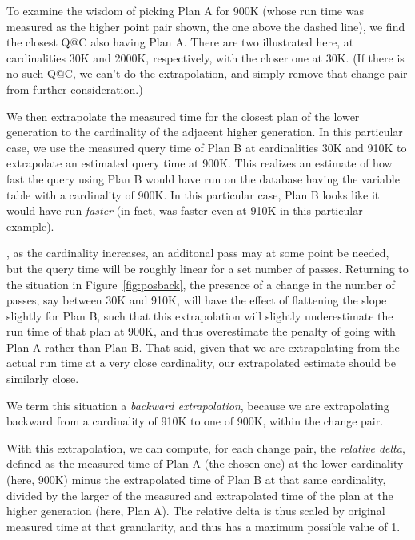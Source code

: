 \documentclass[prodmode,acmtods]{acmsmall}
\begin{document}
To examine the wisdom of picking Plan A for 900K (whose run time was measured as
the higher point pair shown, the one above the dashed line), we find the closest Q@C
also having Plan A. There are two illustrated here, at cardinalities 30K and
2000K, respectively, with the closer one at 30K. (If there is no such Q@C,
we can't do the extrapolation, and simply remove that change pair from
further consideration.)

We then extrapolate the measured time for the closest plan of the lower
generation to the cardinality of the adjacent higher generation. In this
particular case, we use the measured query time of Plan
B at cardinalities 30K and 910K to extrapolate an estimated query time at 900K.
This realizes an estimate of how fast the query using Plan B would have run
on the database having the variable table with a cardinality of 900K. In
this particular case, Plan B looks like it would have run {\em faster} (in
fact, was faster even at 910K in this particular example).

, as
the cardinality increases, an additonal pass may at some point be needed,
but the query time will be roughly linear for a set number of passes.
Returning to the situation in Figure~\ref{fig:posback}, the presence of a change in the number of passes, say between 30K and 910K,
will have the effect of flattening the slope slightly for Plan B, such that
this extrapolation will slightly underestimate the run time of
that plan at 900K, and thus overestimate the penalty of going with
Plan A rather than Plan B. That said,
given that we are extrapolating from the actual run time at a very
close cardinality, our extrapolated estimate should be similarly close.

We term this situation a {\em backward extrapolation}, because we are extrapolating
backward from a cardinality of 910K to one of 900K, within the change pair.

With this extrapolation, we can compute, for each change pair, the {\em relative delta}, defined as the
measured time of Plan A (the chosen one) at the lower cardinality (here, 900K) minus the
extrapolated time of Plan B at that same cardinality, divided by the
larger of the measured and extrapolated time of the plan at the higher
generation (here, Plan A). The relative delta is thus scaled by original
measured time at that granularity, and thus has a maximum possible value of 1.
\end{document}
